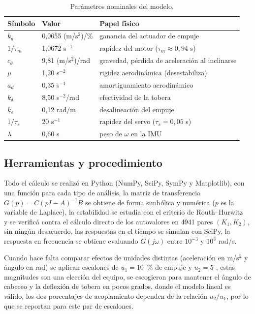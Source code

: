 \documentclass[article, 11pt]{IEEEtran}   %
\begin{document}
\begin{table}[!t]
\centering\small
\caption{Par\'ametros nominales del modelo.}\label{tab:param}
\begin{tabular}{p{0.9cm}p{2.4cm}p{3.6cm}}
\toprule
S\'imbolo & Valor & Papel f\'isico\\
\midrule
$k_a$ & 0,0655 (m/s$^2$)/\% & ganancia del actuador de empuje\\
$1/\tau_m$ & 1,0672 s$^{-1}$ & rapidez del motor ($\tau_m\approx0{,}94$ s)\\
$c_\theta$ & 9,81 (m/s$^2$)/rad & gravedad, p\'erdida de aceleraci\'on al inclinarse\\
$\mu$ & 1,20 s$^{-2}$ & rigidez aerodin\'amica (desestabiliza)\\
$a_d$ & 0,35 s$^{-1}$ & amortiguamiento aerodin\'amico\\
$k_\delta$ & 8,50 s$^{-2}$/rad & efectividad de la tobera\\
$k_\varepsilon$ & 0,12 rad/m & desalineaci\'on del empuje\\
$1/\tau_s$ & 20 s$^{-1}$ & rapidez del servo ($\tau_s=0{,}05$ s)\\
$\lambda$ & 0,60 s & peso de $\omega$ en la IMU\\
\bottomrule
\end{tabular}
\end{table}

\subsection*{Herramientas y procedimiento}
Todo el c\'alculo se realiz\'o en Python (NumPy, SciPy, SymPy y Matplotlib), con una funci\'on para cada tipo de an\'alisis, la matriz de transferencia $G(p)=C(pI-A)^{-1}B$ se obtiene de forma simb\'olica y num\'erica ($p$ es la variable de Laplace), la estabilidad se estudia con el criterio de Routh--Hurwitz~\cite{ogata} y se verific\'a contra el c\'alculo directo de los autovalores en 4941 pares $(K_1,K_2)$, sin ning\'un desacuerdo, las respuestas en el tiempo se simulan con SciPy, la respuesta en frecuencia se obtiene evaluando $G(j\omega)$ entre $10^{-3}$ y $10^{3}$ rad/s.

Cuando hace falta comparar efectos de unidades distintas (aceleraci\'on en m/s$^2$ y \'angulo en rad) se aplican escalones de $u_1=10$~\% de empuje y $u_2=5^\circ$, estas magnitudes son una elecci\'on del equipo, se escogieron para mantener el \'angulo de cabeceo y la deflexi\'on de tobera en pocos grados, donde el modelo lineal es v\'alido, los dos porcentajes de acoplamiento dependen de la relaci\'on $u_2/u_1$, por lo que se reportan para este par de escalones.
\end{document}
